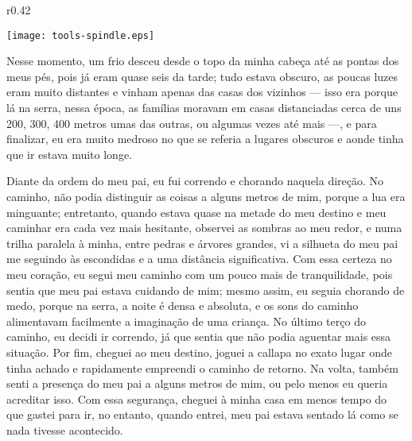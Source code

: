 \ifdefined\EnableIncludeImages
\begin{wrapfigure}{r}{0.42\textwidth}
  \begin{center}
  \vspace{-10pt}
    \texttt{[image: tools-spindle.eps]}
  \end{center}
  \vspace{-20pt}
\end{wrapfigure}
\fi
Nesse momento, um frio desceu desde o topo da minha cabeça até as pontas dos meus pés, pois já eram quase seis da tarde; tudo estava obscuro, as poucas luzes eram muito distantes e vinham apenas das casas dos vizinhos --- isso era porque lá na serra, nessa época, as famílias moravam em casas distanciadas cerca de uns 200, 300, 400 metros umas das outras, ou algumas vezes até mais ---, e para finalizar, eu era muito medroso no que se referia a lugares obscuros e aonde tinha que ir estava muito longe.

Diante da ordem do meu pai, eu fui correndo e chorando naquela direção. No caminho, não podia distinguir as coisas a alguns metros de mim, porque a lua era minguante; entretanto, quando estava quase na metade do meu destino e meu caminhar era cada vez mais hesitante, observei as sombras ao meu redor, e numa trilha paralela à minha, entre pedras e árvores grandes, vi a silhueta do meu pai me seguindo às escondidas e a uma distância significativa.
Com essa certeza no meu coração, eu segui meu caminho com um pouco mais de tranquilidade, pois sentia que meu pai estava cuidando de mim; mesmo assim, eu seguia chorando de medo, porque na serra, a noite é densa e absoluta, e os sons do caminho alimentavam facilmente a imaginação de uma criança.
No último terço do caminho, eu decidi ir correndo, já que sentia que não podia aguentar mais essa situação. Por fim, cheguei ao meu destino, joguei a callapa no exato lugar onde tinha achado e rapidamente empreendi o caminho de retorno.
Na volta, também senti a presença do meu pai a alguns metros de mim, ou pelo menos eu queria acreditar isso. Com essa segurança, cheguei à minha casa em menos tempo do que gastei para ir, no entanto, quando entrei, meu pai estava sentado lá como se nada tivesse acontecido.


